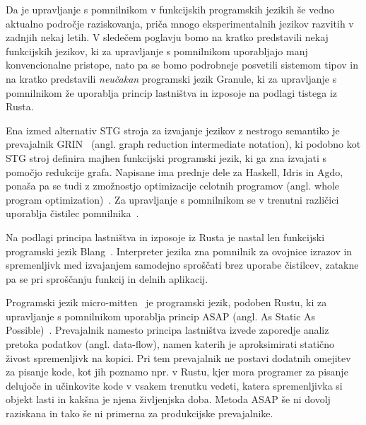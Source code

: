 
Da je upravljanje s pomnilnikom v funkcijskih programskih jezikih še vedno aktualno področje raziskovanja, priča mnogo eksperimentalnih jezikov razvitih v zadnjih nekaj letih. V sledečem poglavju bomo na kratko predstavili nekaj funkcijskih jezikov, ki za upravljanje s pomnilnikom uporabljajo manj konvencionalne pristope, nato pa se bomo podrobneje posvetili sistemom tipov in na kratko predstavili \textit{neučakan} programski jezik Granule, ki za upravljanje s pomnilnikom že uporablja princip lastništva in izposoje na podlagi tistega iz Rusta.

Ena izmed alternativ STG stroja za izvajanje jezikov z nestrogo semantiko je  prevajalnik GRIN~\cite{boquist1997grin} (angl. graph reduction intermediate notation), ki podobno kot STG stroj definira majhen funkcijski programski jezik, ki ga zna izvajati s pomočjo redukcije grafa. Napisane ima prednje dele za Haskell, Idris in Agdo, ponaša pa se tudi z zmožnostjo optimizacije celotnih programov (angl. whole program optimization)~\cite{podlovics2022modern}. Za upravljanje s pomnilnikom se v trenutni različici uporablja čistilec pomnilnika~\cite{boquist1999code}.

Na podlagi principa lastništva in izposoje iz Rusta je nastal len funkcijski programski jezik Blang~\cite{Kocjan_Turk_2022}. Interpreter jezika zna pomnilnik za ovojnice izrazov in spremenljivk med izvajanjem samodejno sproščati brez uporabe čistilcev, zatakne pa se pri sproščanju funkcij in delnih aplikacij. 

Programski jezik micro-mitten~\cite{corbyn:practical-static-memory-management} je programski jezik, podoben Rustu, ki za upravljanje s pomnilnikom uporablja princip ASAP (angl. As Static As Possible)~\cite{proust2017asap}. Prevajalnik namesto principa lastništva izvede zaporedje analiz pretoka podatkov (angl. data-flow), namen katerih je aproksimirati statično živost spremenljivk na kopici. Pri tem prevajalnik ne postavi dodatnih omejitev za pisanje kode, kot jih poznamo npr. v Rustu, kjer mora programer za pisanje delujoče in učinkovite kode v vsakem trenutku vedeti, katera spremenljivka si objekt lasti in kakšna je njena življenjska doba. Metoda ASAP še ni dovolj raziskana in tako še ni primerna za produkcijske prevajalnike.
